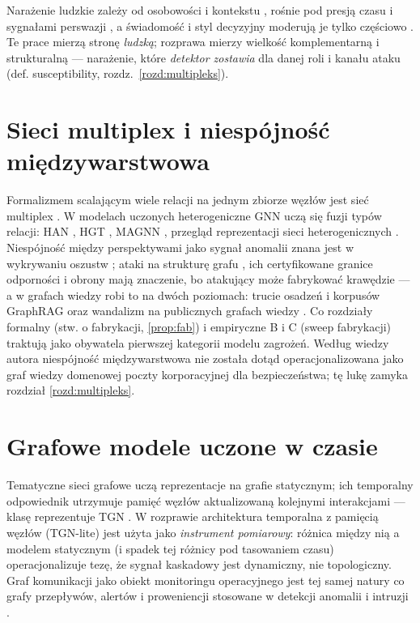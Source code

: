 Narażenie ludzkie zależy od osobowości i kontekstu
\citep{halevi2015spearphishing}, rośnie pod presją czasu
i sygnałami perswazji \citep{butavicius2022why}, a świadomość
i styl decyzyjny moderują je tylko częściowo \citep{sturman2025security}.
Te prace mierzą stronę \emph{ludzką}; rozprawa mierzy wielkość
komplementarną i strukturalną --- narażenie, które \emph{detektor
zostawia} dla danej roli i kanału ataku (def. susceptibility,
rozdz.~\ref{rozd:multipleks}).

\section{Sieci multiplex i niespójność międzywarstwowa}
\label{sec:p-multiplex}

Formalizmem scalającym wiele relacji na jednym zbiorze węzłów jest
sieć multiplex \citep{kivela2014multilayer,dedomenico2013mathematical,
magnani2013combinatorial,jeude2019multilayer}. W modelach uczonych
heterogeniczne GNN uczą się fuzji typów relacji: HAN
\citep{wang2019heterogeneous}, HGT \citep{hu2020heterogeneous},
MAGNN \citep{fu2020magnn}, przegląd reprezentacji sieci
heterogenicznych \citep{christophides2021overview,cen2019representation}.
Niespójność między perspektywami jako sygnał anomalii znana jest
w wykrywaniu oszustw \citep{liu2020alleviating}; ataki na strukturę
grafu \citep{zugner2018adversarial,zugner2019adversarial,
dai2022towards}, ich certyfikowane granice odporności
\citep{zugner2021certified} i obrony \citep{zhang2020gnnguard,jin2020graph,
cai2021structural,wang2023label} mają znaczenie, bo atakujący może
fabrykować krawędzie --- a w grafach wiedzy robi to na dwóch
poziomach: trucie osadzeń i korpusów GraphRAG
\citep{zhang2019poisoning,you2023mass,zou2024poisonedrag,
wen2025fewwords,kepo2026} oraz wandalizm na publicznych grafach
wiedzy \citep{heindorf2017wsdmcup,sarabadani2017tools,
heindorf2019debiasing}. Co rozdziały formalny (stw.
o fabrykacji, \ref{prop:fab}) i empiryczne B i C (sweep fabrykacji)
traktują jako obywatela pierwszej kategorii modelu zagrożeń.
Według wiedzy autora niespójność międzywarstwowa nie została
dotąd operacjonalizowana jako graf wiedzy domenowej poczty
korporacyjnej dla bezpieczeństwa; tę lukę zamyka rozdział
\ref{rozd:multipleks}.

\section{Grafowe modele uczone w czasie}
\label{sec:p-gnn}

Tematyczne sieci grafowe uczą reprezentacje na grafie statycznym;
ich temporalny odpowiednik utrzymuje pamięć węzłów aktualizowaną
kolejnymi interakcjami --- klasę reprezentuje TGN
\citep{rossi2020temporal}. W rozprawie architektura temporalna
z pamięcią węzłów (TGN-lite) jest użyta jako \emph{instrument
pomiarowy}: różnica między nią a modelem statycznym (i spadek
tej różnicy pod tasowaniem czasu) operacjonalizuje tezę, że
sygnał kaskadowy jest dynamiczny, nie topologiczny. Graf
komunikacji jako obiekt monitoringu operacyjnego jest tej samej
natury co grafy przepływów, alertów i proweniencji stosowane
w detekcji anomalii i intruzji \citep{nayeri2026alert,weng2024rtapt}.

